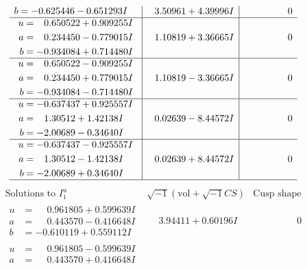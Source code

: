 \documentclass[1p]{elsarticle_modified}
\theoremstyle{definition}
\newcommand{\I}{\sqrt{-1}}
\begin{document}
$$\begin{array}{c|c|c}
\begin{aligned}
b &= -0.625446 - 0.651293 I\end{aligned}
 & \phantom{-}3.50961 + 4.39996 I & \phantom{-0.000000 } 0 \\ \hline\begin{aligned}
u &= \phantom{-}0.650522 + 0.909255 I \\
a &= \phantom{-}0.234450 - 0.779015 I \\
b &= -0.934084 + 0.714480 I\end{aligned}
 & \phantom{-}1.10819 + 3.36665 I & \phantom{-0.000000 } 0 \\ \hline\begin{aligned}
u &= \phantom{-}0.650522 - 0.909255 I \\
a &= \phantom{-}0.234450 + 0.779015 I \\
b &= -0.934084 - 0.714480 I\end{aligned}
 & \phantom{-}1.10819 - 3.36665 I & \phantom{-0.000000 } 0 \\ \hline\begin{aligned}
u &= -0.637437 + 0.925557 I \\
a &= \phantom{-}1.30512 + 1.42138 I \\
b &= -2.00689 - 0.34640 I\end{aligned}
 & \phantom{-}0.02639 - 8.44572 I & \phantom{-0.000000 } 0 \\ \hline\begin{aligned}
u &= -0.637437 - 0.925557 I \\
a &= \phantom{-}1.30512 - 1.42138 I \\
b &= -2.00689 + 0.34640 I\end{aligned}
 & \phantom{-}0.02639 + 8.44572 I & \phantom{-0.000000 } 0\\
 \hline 
 \end{array}$$\newpage$$\begin{array}{c|c|c}  
\text{Solutions to }I^u_{1}& \I (\text{vol} + \sqrt{-1}CS) & \text{Cusp shape}\\
 \hline 
\begin{aligned}
u &= \phantom{-}0.961805 + 0.599639 I \\
a &= \phantom{-}0.443570 - 0.416648 I \\
b &= -0.610119 + 0.559112 I\end{aligned}
 & \phantom{-}3.94411 + 0.60196 I & \phantom{-0.000000 } 0 \\ \hline\begin{aligned}
u &= \phantom{-}0.961805 - 0.599639 I \\
a &= \phantom{-}0.443570 + 0.416648 I \\

\end{aligned}
\end{array}$$
\end{document}
